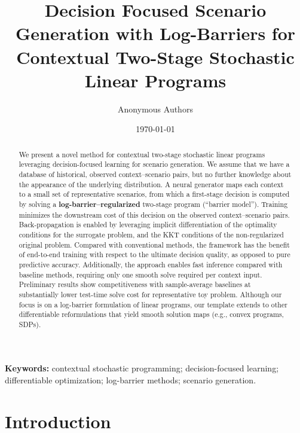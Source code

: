 \documentclass{article}
\title{Decision Focused Scenario Generation with Log-Barriers for Contextual Two-Stage Stochastic Linear Programs}
\author{Anonymous Authors}
\date{\today}
\begin{document}
\maketitle

\begin{abstract}
We present a novel method for contextual two-stage stochastic linear programs leveraging decision-focused learning for scenario generation. 
We assume that we have a database of historical, observed context–scenario pairs, but no further knowledge about the appearance of the underlying distribution. 
A neural generator maps each context to a small set of representative scenarios, from which a first-stage decision is computed by solving a \textbf{log-barrier–regularized} two-stage program (“barrier model”). 
Training minimizes the downstream cost of this decision on the observed context–scenario pairs. 
Back-propagation is enabled by leveraging implicit differentiation of the optimality conditions for the surrogate problem, and the KKT conditions of the non-regularized original problem.
Compared with conventional methods, the framework has the benefit of end-to-end training with respect to the ultimate decision quality, as opposed to pure predictive accuracy.
Additionally, the approach enables fast inference compared with baseline methods, requiring only one smooth solve required per context input.
Preliminary results show competitiveness with sample-average baselines at substantially lower test-time solve cost for
representative toy problem. 
Although our focus is on a log-barrier formulation of linear programs, our template extends to other differentiable reformulations that yield smooth solution maps (e.g., convex programs, SDPs).
\end{abstract}

\noindent\textbf{Keywords:} contextual stochastic programming; decision-focused learning; differentiable optimization; log-barrier methods; scenario generation.


\section{Introduction}
\end{document}
